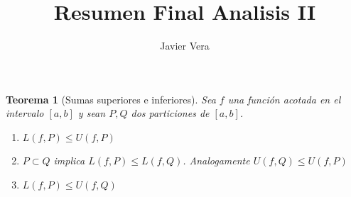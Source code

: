 \documentclass{article}
\theoremstyle{break}
\newtheorem{theorem}{Teorema}[section]
\begin{document}
    
\title{Resumen Final Analisis II}
\author{Javier Vera}
\maketitle
\newpage

\begin{theorem}[Sumas superiores e inferiores]
	Sea $f$ una función acotada en el intervalo $[a,b]$ y sean $P,Q$ dos particiones de $[a,b]$.
	\begin{enumerate}
		\item $L(f,P) \leq U(f,P)$
		\item $P \subset Q$ implica $L(f,P) \leq L(f,Q)$. Analogamente $U(f,Q) \leq U(f,P)$
		\item $L(f,P) \leq U(f,Q)$
	\end{enumerate}
\end{theorem}
\end{document}
